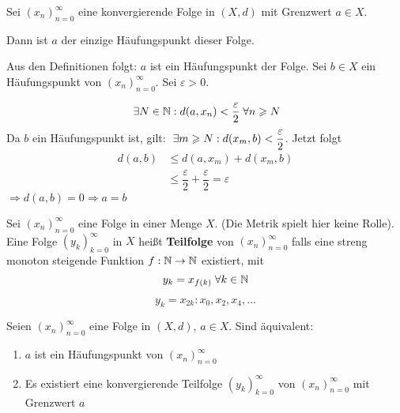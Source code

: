 \documentclass[main.tex]{subfiles}
\begin{document}
\begin{Theorem}
  Sei $(x_n)_{n=0}^\infty$ eine konvergierende Folge in $(X,d)$ mit Grenzwert $a \in X$.

  Dann ist $a$ der einzige Häufungspunkt dieser Folge.
\end{Theorem}

\begin{Beweis}
  Aus den Definitionen folgt: $a$ ist ein Häufungspunkt der Folge. Sei $b \in X$ ein Häufungspunkt von $(x_n)_{n=0}^\infty$. Sei $\varepsilon > 0$.

  $$\;\exists N \in \mathbb{N} : d(a,x_n) < \dfrac{\varepsilon}{2} \;\forall n \geqslant N$$
  Da $b$ ein Häufungspunkt ist, gilt: $\;\exists m \geqslant N : d(x_m,b) < \dfrac{\varepsilon}{2}$. Jetzt folgt
  $$\begin{aligned}
    d(a,b) &\leq d(a,x_m) + d(x_m,b)\\
    &\leq \dfrac{\varepsilon}{2} + \dfrac{\varepsilon}{2} = \varepsilon
  \end{aligned}$$
  $\Rightarrow d(a,b) = 0 \Rightarrow a = b$
\end{Beweis}

\begin{Definition}[Teilfolge]
  Sei $(x_n)_{n=0}^\infty$ eine Folge in einer Menge $X$. (Die Metrik spielt hier keine Rolle). Eine Folge $(y_k)_{k=0}^\infty$ in $X$ heißt \textbf{Teilfolge} von $(x_n)_{n=0}^\infty$ falls eine streng monoton steigende Funktion $f:\mathbb{N} \to \mathbb{N}$ existiert, mit
  $$y_k = x_{f(k)} \;\forall k \in \mathbb{N}$$
\end{Definition}

\begin{Beispiel}
  $$y_k = x_{2k}: x_0,x_2,x_4,...$$
\end{Beispiel}

\begin{Theorem}
  Seien $(x_n)_{n=0}^\infty$ eine Folge in $(X,d)$, $a \in X$. Sind äquivalent:
  \begin{enumerate}
    \item $a$ ist ein Häufungspunkt von $(x_n)_{n=0}^\infty$
    \item Es existiert eine konvergierende Teilfolge $(y_k)_{k=0}^\infty$ von $(x_n)_{n=0}^\infty$ mit Grenzwert $a$
  \end{enumerate}
\end{Theorem}
\end{document}
